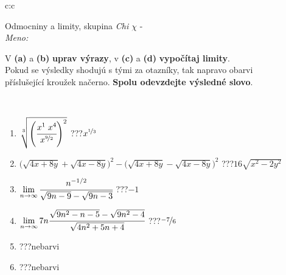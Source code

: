 \documentclass[10pt]{report}
\begin{document}
\newpage
\thispagestyle{empty}
\begin{tabular}{c:c}
\begin{minipage}[c][104.5mm][t]{0.5\linewidth}
\begin{center}
\vspace{7mm}
{\huge Odmocniny a limity, skupina \textit{Chi $\chi$} -}\\[5mm]
\textit{Meno:}\phantom{xxxxxxxxxxxxxxxxxxxxxxxxxxxxxxxxxxxxxxxxxxxxxxxxxxxxxxxxxxxxxxxxx}\\[5mm]
\begin{minipage}{0.95\linewidth}
\begin{center}
V \textbf{(a)} a \textbf{(b)} \textbf{uprav výrazy}, v \textbf{(c)} a \textbf{(d)} \textbf{vypočítaj limity}.\\Pokud se výsledky shodujú s tými za otazníky, tak napravo obarvi\\příslušející kroužek načerno. \textbf{Spolu odevzdejte výsledné slovo}.
\end{center}
\end{minipage}
\\[1mm]
\begin{minipage}{0.79\linewidth}
\begin{center}
\begin{varwidth}{\linewidth}
\begin{enumerate}
\small
\item $\sqrt[3]{\left(\cfrac{x^{1}\;x^{4}}{x^{\nicefrac{9}{2}}}\right)^{2}}$\quad \dotfill\; ???\;\dotfill \quad $x^{\nicefrac{1}{3}}$
\item {\footnotesize{\scriptsize$\big(\sqrt{4x+8y}+\sqrt{4x-8y}\big)^2-\big(\sqrt{4x+8y}-\sqrt{4x-8y}\big)^2$}\quad \dotfill\; ???\;\dotfill \quad $16\sqrt{x^2-2y^2}$}
\item $\lim\limits_{n\to\infty}\cfrac{n^{-1/2}}{\sqrt{9n-9}-\sqrt{9n-3}}$\quad \dotfill\; ???\;\dotfill \quad $-1$
\item $\lim\limits_{n\to\infty}7n\cfrac{\sqrt{9n^2-n-5}-\sqrt{9n^2-4}}{\sqrt{4n^2+5n+4}}$\quad \dotfill\; ???\;\dotfill \quad $\nicefrac{-7}{6}$
\item \quad \dotfill\; ???\;\dotfill \quad nebarvi
\item \quad \dotfill\; ???\;\dotfill \quad nebarvi
\end{enumerate}
\end{varwidth}
\end{center}
\end{minipage}
\begin{minipage}{0.20\linewidth}

\end{minipage}
\end{center}
\end{minipage}
\end{tabular}
\end{document}
